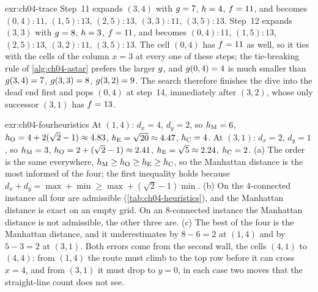 
\begin{solution}{exr:ch04-trace}
Step~11 expands $(3,4)$ with $g=7$, $h=4$, $f=11$, and \Open becomes $(0,4){:}11$, $(1,5){:}13$, $(2,5){:}13$, $(3,3){:}11$, $(3,5){:}13$. Step~12 expands $(3,3)$ with $g=8$, $h=3$, $f=11$, and \Open becomes $(0,4){:}11$, $(1,5){:}13$, $(2,5){:}13$, $(3,2){:}11$, $(3,5){:}13$. The cell $(0,4)$ has $f=11$ as well, so it ties with the cells of the column $x=3$ at every one of these steps; the tie-breaking rule of \cref{alg:ch04-astar} prefers the larger $g$, and $g(0,4)=4$ is much smaller than $g(3,4)=7$, $g(3,3)=8$, $g(3,2)=9$. The search therefore finishes the dive into the dead end first and pops $(0,4)$ at step~14, immediately after $(3,2)$, whose only successor $(3,1)$ has $f=13$.
\end{solution}

\begin{solution}{exr:ch04-fourheuristics}
At $(1,4)$: $d_x=4$, $d_y=2$, so $h_{\mathrm{M}}=6$, $h_{\mathrm{O}}=4+2(\sqrt2-1)\approx4.83$, $h_{\mathrm{E}}=\sqrt{20}\approx4.47$, $h_{\mathrm{C}}=4$. At $(3,1)$: $d_x=2$, $d_y=1$, so $h_{\mathrm{M}}=3$, $h_{\mathrm{O}}=2+(\sqrt2-1)\approx2.41$, $h_{\mathrm{E}}=\sqrt5\approx2.24$, $h_{\mathrm{C}}=2$. (a) The order is the same everywhere, $h_{\mathrm{M}}\ge h_{\mathrm{O}}\ge h_{\mathrm{E}}\ge h_{\mathrm{C}}$, so the Manhattan distance is the most informed of the four; the first inequality holds because $d_x+d_y=\max+\min\ge\max+(\sqrt2-1)\min$. (b) On the 4-connected instance all four are admissible (\cref{tab:ch04-heuristics}), and the Manhattan distance is exact on an empty grid. On an 8-connected instance the Manhattan distance is not admissible, the other three are. (c) The best of the four is the Manhattan distance, and it underestimates by $8-6=2$ at $(1,4)$ and by $5-3=2$ at $(3,1)$. Both errors come from the second wall, the cells $(4,1)$ to $(4,4)$: from $(1,4)$ the route must climb to the top row before it can cross $x=4$, and from $(3,1)$ it must drop to $y=0$, in each case two moves that the straight-line count does not see.
\end{solution}

